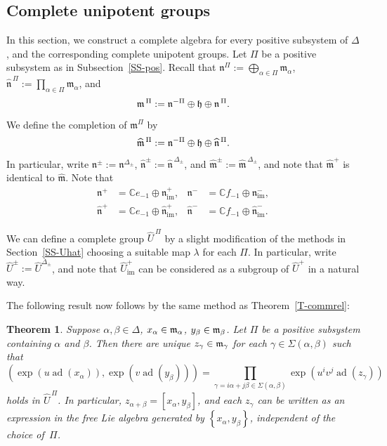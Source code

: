 \documentclass[11pt,letterpaper]{amsart}
\newcounter{thecounter}
\numberwithin{thecounter}{section}
\newtheorem{theorem}[thecounter]{Theorem}
\theoremstyle{definition}
\DeclareMathOperator{\ad}{ad}
\DeclareMathOperator{\im}{{im}}
\renewcommand{\a}{\alpha}
\renewcommand{\b}{\beta}
\newcommand{\g}{\gamma}
\newcommand{\C}{{\mathbb C}}
\newcommand{\UhPi}{{\widehat{U}^{\,\Pi}}}
\newcommand{\Uhimp}{{\widehat{U}_{\im}^+}}
\newcommand{\m}{{\mathfrak{m}}}
\newcommand{\mhat}{{\widehat{\mathfrak{m}}}}
\newcommand{\n}{{\mathfrak{n}}}
\newcommand{\nh}{\widehat{\mathfrak{n}}}
\newcommand{\np}{{\mathfrak{n}^+}}
\newcommand{\nhp}{{\widehat{\mathfrak{n}}^+}}
\newcommand{\nm}{{\mathfrak{n}^-}}
\newcommand{\nhm}{{\widehat{\mathfrak{n}}^-}}
\newcommand{\nimp}{{\mathfrak{n}_{\im}^+}}
\newcommand{\nhimp}{{\widehat{\mathfrak{n}}_{\im}^+}}
\newcommand{\nimm}{{\mathfrak{n}_{\im}^-}}
\newcommand{\nhimm}{{\widehat{\mathfrak{n}}_{\im}^-}}
\begin{document}
\subsection{Complete unipotent groups}\label{SS-PositiveRootSys}
In this section, we construct a complete algebra for every positive  subsystem of $\Delta$, and the corresponding complete unipotent groups.
Let $\Pi$ be a positive  subsystem as in Subsection~\ref{SS-pos}.
Recall that $ \mathfrak{n}^{\Pi} := \bigoplus_{\a\in\Pi}\m_\a$, $\nh^{\,\Pi}:=\prod_{\a\in\Pi}\m_\a$, and 
$${\frak m}^{\,\Pi} :=    \mathfrak{n}^{-\Pi} \oplus \frak h \oplus \n^{\,\Pi}.$$
We define the completion of $\m^\Pi$ by
$$\widehat{\frak m}^{\,\Pi} :=    \mathfrak{n}^{-\Pi} \oplus \frak h \oplus \nh^{\,\Pi}.$$
In particular, write $\mathfrak{n}^{\pm}:= \mathfrak{n}^{\Delta_{\pm}}$, $\nh^{\pm}:= \nh^{\,\Delta_{\pm}}$, and 
$\mhat^{\pm}:= \mhat^{\,\Delta_{\pm}}$, and note that $\mhat^+$ is identical to $\mhat$.
Note that 
\begin{align*}
\np&=\C e_{-1}\oplus \nimp, &\nm&=\C f_{-1}\oplus \nimm,\\
\nhp&=\C e_{-1}\oplus \nhimp, &\nhm&=\C f_{-1}\oplus \nhimm.
\end{align*}

We can define a complete group $\widehat{U}^{\,\Pi}$ 
 by a slight modification of the methods in Section~\ref{SS-Uhat} choosing a suitable map $\lambda$ for each $\Pi$.
In particular, write $\widehat{U}^{\pm}:=\widehat{U}^{\Delta_\pm}$, and note that
$\Uhimp$ can be considered as a subgroup of $\widehat{U}^{+}$ in a natural way.

The following result now follows by the same method as Theorem~\ref{T-commrel}:
\begin{theorem}\label{T-commrel2}
Suppose $\a,\b\in\Delta$, $x_{\a}\in{\frak m}_{\a}$, $y_{\b}\in{\frak m}_{\b}$. Let $\Pi$ be a positive  subsystem containing $\a$ and $\b$. Then there are unique $z_{\g}\in{\frak m}_{\g}$ for each
$\g\in\Sigma(\a,\b)$ such that
$$\left(\exp\left(u\ad\left(x_{\a}\right)\right),\exp\left(v\ad\left(y_{\b}\right)\right)\right) =\prod_{\g=i\a+j\b\in\Sigma(\a,\b)} \exp\left(u^i v^j\ad\left(z_{\g}\right)\right)$$
holds in $\UhPi$.
In particular, $z_{\a+\b}=\left[x_{\a},y_{\b}\right]$, and each $z_\g$ can be written as an expression in the free Lie algebra generated by $\left\{x_{\a},y_{\b}\right\}$, independent of the choice of $\,\Pi$.
\end{theorem}
\end{document}
